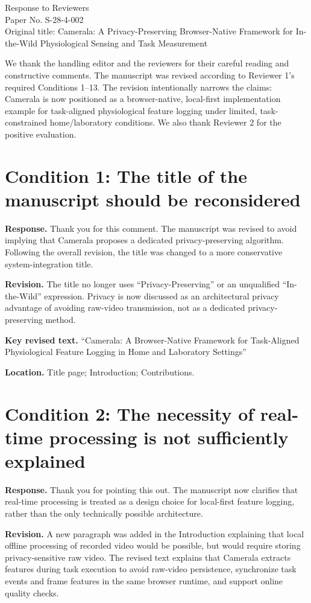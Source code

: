 \documentclass[11pt]{article}
\newcommand{\condition}[2]{\section*{Condition #1: #2}}
\begin{document}
\begin{center}
{\Large Response to Reviewers}\\[4pt]
Paper No. S-28-4-002\\
Original title: Camerala: A Privacy-Preserving Browser-Native Framework for In-the-Wild Physiological Sensing and Task Measurement
\end{center}

We thank the handling editor and the reviewers for their careful reading and constructive comments.
The manuscript was revised according to Reviewer 1's required Conditions 1--13.
The revision intentionally narrows the claims: Camerala is now positioned as a browser-native, local-first implementation example for task-aligned physiological feature logging under limited, task-constrained home/laboratory conditions.
We also thank Reviewer 2 for the positive evaluation.

\condition{1}{The title of the manuscript should be reconsidered}
\textbf{Response.}
Thank you for this comment.
The manuscript was revised to avoid implying that Camerala proposes a dedicated privacy-preserving algorithm.
Following the overall revision, the title was changed to a more conservative system-integration title.

\textbf{Revision.}
The title no longer uses ``Privacy-Preserving'' or an unqualified ``In-the-Wild'' expression.
Privacy is now discussed as an architectural privacy advantage of avoiding raw-video transmission, not as a dedicated privacy-preserving method.

\textbf{Key revised text.}
``Camerala: A Browser-Native Framework for Task-Aligned Physiological Feature Logging in Home and Laboratory Settings''

\textbf{Location.}
Title page; Introduction; Contributions.

\condition{2}{The necessity of real-time processing is not sufficiently explained}
\textbf{Response.}
Thank you for pointing this out.
The manuscript now clarifies that real-time processing is treated as a design choice for local-first feature logging, rather than the only technically possible architecture.

\textbf{Revision.}
A new paragraph was added in the Introduction explaining that local offline processing of recorded video would be possible, but would require storing privacy-sensitive raw video.
The revised text explains that Camerala extracts features during task execution to avoid raw-video persistence, synchronize task events and frame features in the same browser runtime, and support online quality checks.
\end{document}
